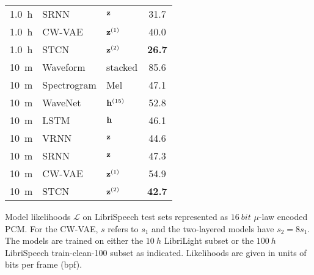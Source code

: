 {\begin{table}
\begin{subtable}[t]{.485\textwidth}
\begin{adjustbox}{center, totalheight=0.37\paperheight}
\begin{tabular}[t]{cll|c}
        \SI{1.0}{h}   &  SRNN            & ${\mathbf{z}}$         &   31.7   \\  %
        \SI{1.0}{h}   &  CW-VAE          & ${\mathbf{z}}^{(1)}$   &   40.0   \\  %
        \SI{1.0}{h}   &  STCN            & ${\mathbf{z}}^{(2)}$   &   \textbf{26.7}   \\  %
        \midrule
        \SI{10}{m}    &  Waveform        & stacked       &   85.6   \\  %
        \SI{10}{m}    &  Spectrogram     & Mel           &   47.1   \\  %
        \SI{10}{m}    &  WaveNet         & ${\mathbf{h}}^{(15)}$  &   52.8   \\  %
        \SI{10}{m}    &  LSTM            & ${\mathbf{h}}$         &   46.1   \\  %
        \SI{10}{m}    &  VRNN            & ${\mathbf{z}}$         &   44.6   \\  %
        \SI{10}{m}    &  SRNN            & ${\mathbf{z}}$         &   47.3   \\  %
        \SI{10}{m}    &  CW-VAE          & ${\mathbf{z}}^{(1)}$   &   54.9   \\  %
        \SI{10}{m}    &  STCN            & ${\mathbf{z}}^{(2)}$   &   \textbf{42.7}   \\  %
\bottomrule
    \end{tabular}
    \end{adjustbox}
    \label{tab: phoneme recognition (PER)}
\end{subtable}%
\hfill
\end{table}
%
\begin{table*}[t]
    \caption[Model likelihoods on LibriSpeech test sets.]{
    Model likelihoods $\mathcal{L}$ on LibriSpeech test sets represented as $\SI{16}{bit}$ $\mu$-law encoded PCM.
    For the CW-VAE, $s$ refers to $s_1$ and the two-layered models have $s_2=8s_1$.
    The models are trained on either the $\SI{10}{h}$ LibriLight subset or the $\SI{100}{h}$ LibriSpeech \textrm{train-clean-100} subset as indicated.
    Likelihoods are given in units of bits per frame (bpf).
    }
    \centering
    \begin{adjustbox}{center, totalheight=0.182\paperheight}

\end{adjustbox}
\end{table*}}
